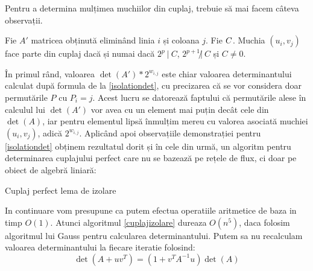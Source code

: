 \pagebreak

Pentru a determina mulțimea muchiilor din cuplaj, trebuie să mai facem câteva observații.

\begin{lem}
  Fie $A'$ matricea obținută eliminând linia $i$ și coloana $j$. Fie
  $C \def \det(A') * \frac{2^{w_{i,j}}}$. Muchia
  $(u_{i}, v_{j})$ face parte din cuplaj dacă și numai dacă $2^{p} \ | \ C$,
  $2^{p+1} \not| \ C$ și $C \neq 0$.
\end{lem}

În primul rând, valoarea $\det(A') * 2^{w_{i,j}}$ este chiar valoarea
determinantului calculat după formula de la \ref{isolationdet}, cu precizarea că
se vor considera doar permutările $P$ cu $P_{i} = j$. Acest lucru se datorează
faptului că permutările alese în calculul lui $\det(A')$ vor avea cu un element
mai puțin decât cele din $\det(A)$, iar pentru elementul lipsă înmulțim mereu cu
valorea asociată muchiei $(u_{i}, v_{j})$, adică $2^{w_{i,j}}$.
Aplicând apoi observațiile demonstrației pentru \ref{isolationdet} obținem
rezultatul dorit și în cele din urmă, un algoritm pentru determinarea cuplajului
perfect care nu se bazează pe rețele de flux, ci doar pe obiect de algebră
liniară: \par

\vspace{5 mm}

\begin{algorithm}[H]
 \label{cuplajizolare}
 \caption{Cuplaj perfect lema de izolare}
\end{algorithm}

\pagebreak

In continuare vom presupune ca putem efectua operatiile aritmetice de baza in timp $O(1)$.
Atunci algoritmul \ref{cuplajizolare} dureaza $O(n^{5})$, daca folosim
algoritmul lui Gauss pentru calcularea determinantului. Putem sa nu recalculam
valoarea determinantului la fiecare iteratie folosind:
\begin{equation}
  \det(A + uv^{T}) = (1 + v^{T} A^{-1} u) \det(A)
\end{equation}

